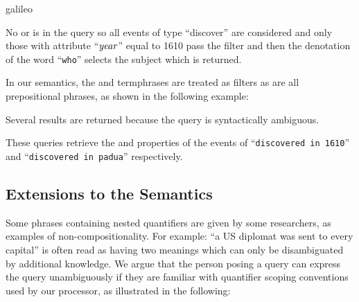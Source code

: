 \documentclass[../main.tex]{subfiles}
\begin{document}
\begin{refsection}
\examplespacing

 {galileo}

\examplespacing

\noindent No  or  is in the query so all events of type ``discover'' are considered and only those with attribute ``$\operatorname{\mathit{year}}$'' equal to 1610 pass the filter and then the denotation of the word ``\texttt{who}'' selects the subject which is returned.

In our semantics, the  and  termphrases are treated as filters as are all prepositional phrases, as shown in the following example:

\examplespacing


\examplespacing

\noindent Several results are returned because the query is syntactically ambiguous.

\examplespacing



\examplespacing

\noindent These queries retrieve the  and  properties of the events of ``\texttt{discovered in 1610}'' and ``\texttt{discovered in padua}'' respectively.

\subsection{Extensions to the Semantics}
\label{webist2019conf:extend}

Some phrases containing nested quantifiers are given by some researchers, as examples of non-compositionality. For example: ``a US diplomat was sent to every capital'' is often read as having two meanings which can only be disambiguated by additional knowledge. We argue that the person posing a query can express the query unambiguously if they are familiar with quantifier scoping conventions used by our processor, as illustrated in the following:

\examplespacing


\end{refsection}
\end{document}
